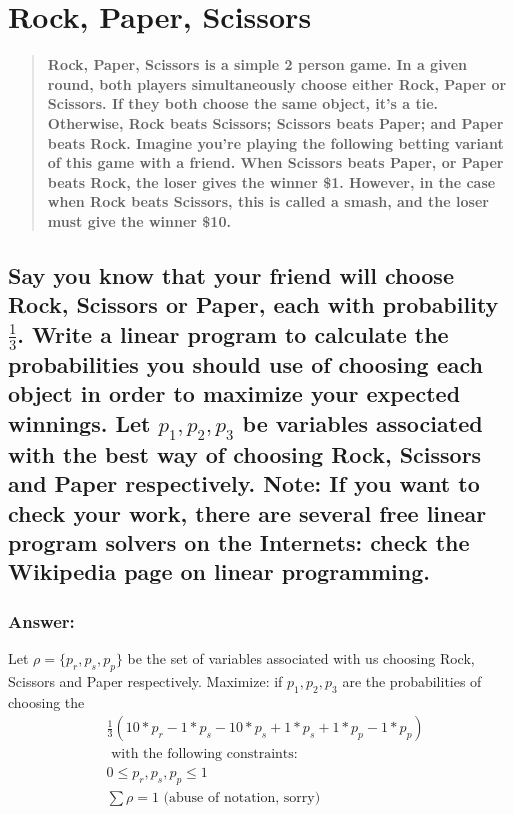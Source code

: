 \documentclass[titlepage]{article}\usepackage[]{graphicx}\usepackage[]{color}
\begin{document}
\section{Rock, Paper, Scissors}
  \begin{quote}
    \textbf{Rock, Paper, Scissors is a simple 2 person game. In a given round,
    both players simultaneously choose either Rock, Paper or Scissors. If they
    both choose the same object, it’s a tie. Otherwise, Rock beats Scissors;
    Scissors beats Paper; and Paper beats Rock. Imagine you’re playing the
    following betting variant of this game with a friend. When Scissors beats
    Paper, or Paper beats Rock, the loser gives the winner \$1. However, in the case
    when Rock beats Scissors, this is called a \textbf{smash}, and the loser must give the
    winner \$10.}
  \end{quote}

  \subsection{Say you know that your friend will choose Rock, Scissors or
        Paper, each with probability $\frac{1}{3}$. Write a linear program to
        calculate the probabilities you should use of choosing each object in
        order to maximize your expected winnings. Let $p_1,p_2,p_3$ be variables
        associated with the best way of choosing Rock, Scissors and Paper
        respectively. Note: If you want to check your work, there are several free
        linear program solvers on the Internets: check the Wikipedia page on linear
        programming.} 
  \subsubsection{Answer:}

  Let $\rho = \{p_{r}, p_{s}, p_{p}\}$ be the set of variables associated with us choosing Rock,
 Scissors and Paper respectively. Maximize: 
  if $p_1, p_2, p_3$ are the probabilities of choosing the 
  \begin{align}
    \label{rps:a}
    & \frac{1}{3}\left(10*p_{r} - 1*p_{s} - 10*p_{s} + 1*p_{s} +  1*p_{p} - 1*p_{p}\right) \\ 
    & \text{ with the following constraints:} \\ 
       & 0 \leq p_r, p_s, p_p \leq 1 \\ 
       & \sum \rho = 1  \text{  (abuse of notation, sorry)}
  \end{align}
\end{document}
